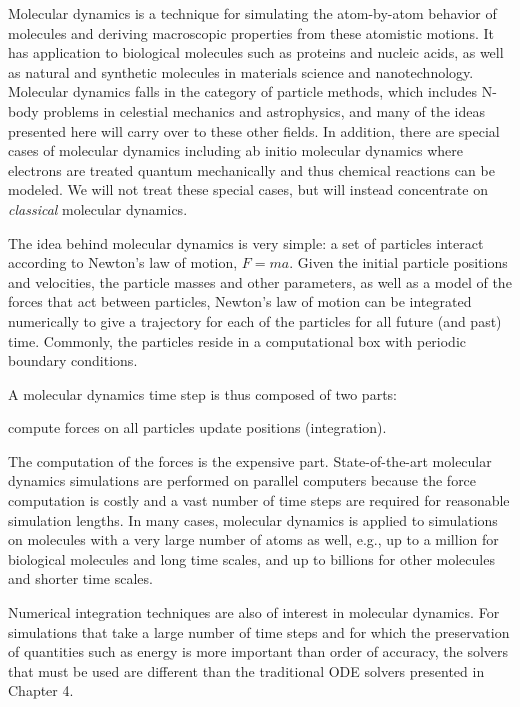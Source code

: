 Molecular dynamics is a technique for simulating the atom-by-atom
behavior of molecules and deriving macroscopic properties from these
atomistic motions.  It has application to biological molecules such as
proteins and nucleic acids, as well as natural and synthetic molecules
in materials science and nanotechnology.  Molecular dynamics falls in
the category of particle methods, which includes N-body problems in
celestial mechanics and astrophysics, and many of the ideas presented
here will carry over to these other fields.  In addition, there are special
cases of molecular dynamics including ab initio molecular dynamics where
electrons are treated quantum mechanically and thus chemical reactions
can be modeled.  We will not treat these special cases, but will instead
concentrate on {\em classical} molecular dynamics.

The idea behind molecular dynamics is very simple:  a set of particles
interact according to Newton's law of motion, $F=ma$.  Given the
initial particle positions and velocities, the particle masses and other
parameters, as well as a model of the forces that act between
particles, Newton's law of motion can be integrated numerically
to give a trajectory for each of the particles for all future (and past)
time.  Commonly, the particles reside in a computational box with 
periodic boundary conditions.

A molecular dynamics time step is thus composed of two parts:
\begin{algorithmic}[1]
\STATE compute forces on all particles
\STATE update positions (integration).
\end{algorithmic}
The computation of the forces is the expensive part.  State-of-the-art
molecular dynamics simulations are performed on parallel computers
because the force computation is costly and a vast number of time steps
are required for reasonable simulation lengths.  In many cases, molecular
dynamics is applied to simulations on molecules with a very large number
of atoms as well, e.g., up to a million for biological molecules and long time
scales, and up to billions for other molecules and shorter time scales.

Numerical integration techniques are also of interest in molecular
dynamics.  For simulations that take a large number of time steps and
for which the preservation of quantities such as energy is more important
than order of accuracy, the solvers that must be used are different than
the traditional ODE solvers presented in Chapter 4.

